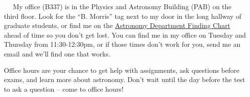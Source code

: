 \documentclass[12pt]{article}
\newcommand{\mytitle}[1]{\vspace{5mm} \noindent{\bf #1:} ~~}
\begin{document}
\mytitle{Office Hours} My office (B337) is in the Physics and Astronomy Building (PAB) on the third floor. Look for the ``B. Morris'' tag next to my door in the long hallway of graduate students, or find me on the \href{http://staff.washington.edu/bmmorris/docs/astromap.pdf}{Astronomy Department Finding Chart} ahead of time so you don't get lost. You can find me in my office on Tuesday and Thursday from 11:30-12:30pm, or if those times don't work for you, send me an email and we'll find one that works. 

Office hours are your chance to get help with assignments, ask questions before exams, and learn more about astronomy. Don't wait until the day before the test to ask a question -- come to office hours!
\end{document}
